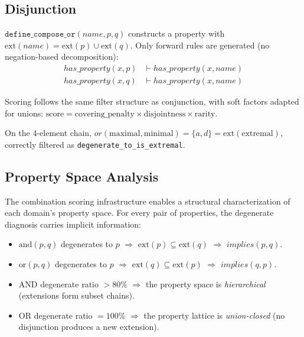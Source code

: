 \subsection{Disjunction}

$\texttt{define\_compose\_or}(\textit{name}, p, q)$ constructs a property with $\mathrm{ext}(\textit{name}) = \mathrm{ext}(p) \cup \mathrm{ext}(q)$. Only forward rules are generated (no negation-based decomposition):
\begin{align*}
\mathit{has\_property}(x, p) &\vdash \mathit{has\_property}(x, \textit{name}) \\
\mathit{has\_property}(x, q) &\vdash \mathit{has\_property}(x, \textit{name})
\end{align*}

Scoring follows the same filter structure as conjunction, with soft factors adapted for unions: $\text{score} = \text{covering\_penalty} \times \text{disjointness} \times \text{rarity}$.

On the 4-element chain, $\mathit{or}(\text{maximal}, \text{minimal}) = \{a, d\} = \mathrm{ext}(\text{extremal})$, correctly filtered as \texttt{degenerate\_to\_is\_extremal}.

\subsection{Property Space Analysis}

The combination scoring infrastructure enables a structural characterization of each domain's property space. For every pair of properties, the degenerate diagnosis carries implicit information:

\begin{itemize}
\item $\text{and}(p, q)$ degenerates to $p$ $\Rightarrow$ $\mathrm{ext}(p) \subseteq \mathrm{ext}(q)$ $\Rightarrow$ $\mathit{implies}(p, q)$.
\item $\text{or}(p, q)$ degenerates to $p$ $\Rightarrow$ $\mathrm{ext}(q) \subseteq \mathrm{ext}(p)$ $\Rightarrow$ $\mathit{implies}(q, p)$.
\item AND degenerate ratio $> 80\%$ $\Rightarrow$ the property space is \emph{hierarchical} (extensions form subset chains).
\item OR degenerate ratio $= 100\%$ $\Rightarrow$ the property lattice is \emph{union-closed} (no disjunction produces a new extension).
\end{itemize}

